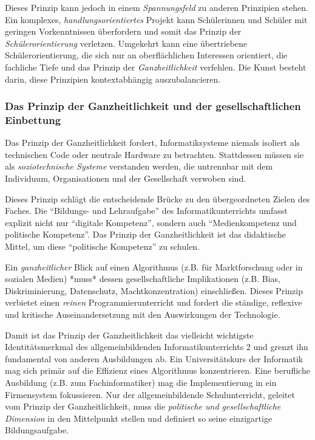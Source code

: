 \documentclass[a5paper,pagesize,10pt,bibtotoc,pointlessnumbers,
normalheadings,DIV=9,twoside=false]{scrbook}
\begin{document}
Dieses Prinzip kann jedoch in einem \textit{Spannungsfeld} zu anderen Prinzipien stehen. Ein komplexes, \textit{handlungsorientiertes} Projekt kann Schülerinnen und Schüler mit geringen Vorkenntnissen überfordern und somit das Prinzip der \textit{Schülerorientierung} verletzen. Umgekehrt kann eine übertriebene Schülerorientierung, die sich nur an oberflächlichen Interessen orientiert, die fachliche Tiefe und das Prinzip der \textit{Ganzheitlichkeit} verfehlen. Die Kunst besteht darin, diese Prinzipien kontextabhängig auszubalancieren.
    
\subsubsection{Das Prinzip der Ganzheitlichkeit und der gesellschaftlichen Einbettung}

Das Prinzip der Ganzheitlichkeit fordert, Informatiksysteme niemals isoliert als technischen Code oder neutrale Hardware zu betrachten. Stattdessen müssen sie als \textit{soziotechnische Systeme} verstanden werden, die untrennbar mit dem Individuum, Organisationen und der Gesellschaft verwoben sind.
    
Dieses Prinzip schlägt die entscheidende Brücke zu den übergeordneten Zielen des Faches. Die ``Bildungs- und Lehraufgabe'' des Informatikunterrichts umfasst explizit nicht nur ``digitale Kompetenz'', sondern auch ``Medienkompetenz und politische Kompetenz''. Das Prinzip der Ganzheitlichkeit ist das didaktische Mittel, um diese ``politische Kompetenz'' zu schulen.
    
Ein \textit{ganzheitlicher} Blick auf einen Algorithmus (z.B. für Marktforschung oder in sozialen Medien) *muss* dessen gesellschaftliche Implikationen (z.B. Bias, Diskriminierung, Datenschutz, Machtkonzentration) einschließen. Dieses Prinzip verbietet ein\-en \textit{reinen} Programmierunterricht und fordert die ständige, reflexive und kritische Auseinandersetzung mit den Auswirkungen der Technologie.

Damit ist das Prinzip der Ganzheitlichkeit das vielleicht wichtigste Identitätsmerkmal des allgemeinbildenden Informatikunterrichts 2 und grenzt ihn fundamental von anderen Ausbildungen ab. Ein Universitätskurs der Informatik mag sich primär auf die Effizienz eines Algorithmus konzentrieren. Eine berufliche Ausbildung (z.B. zum Fachinformatiker) mag die Implementierung in ein Firmensystem fokussieren. Nur der allgemeinbildende Schulunterricht, geleitet vom Prinzip der Ganzheitlichkeit, muss die \textit{politische und gesellschaftliche Dimension} in den Mittelpunkt stellen und definiert so seine einzigartige Bildungsaufgabe.\\
\end{document}
